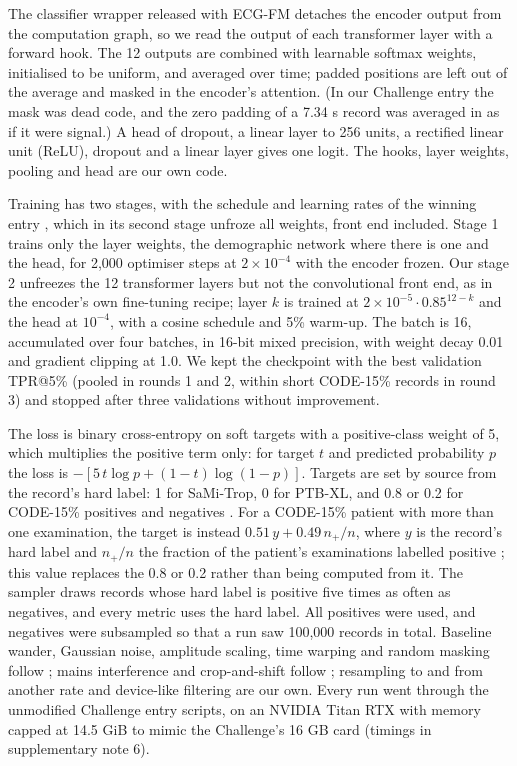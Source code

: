\documentclass{iopjournal}
\makeatletter
\newcommand{\tpr}{TPR@5\%}
\makeatother
\begin{document}
The classifier wrapper released with ECG-FM detaches the encoder output from the computation graph, so we read the output of each transformer layer with a forward hook. The 12 outputs are combined with learnable softmax weights, initialised to be uniform, and averaged over time; padded positions are left out of the average and masked in the encoder's attention. (In our Challenge entry the mask was dead code, and the zero padding of a 7.34 s record was averaged in as if it were signal.) A head of dropout, a linear layer to 256 units, a rectified linear unit (ReLU), dropout and a linear layer gives one logit. The hooks, layer weights, pooling and head are our own code.

Training has two stages, with the schedule and learning rates of the winning entry \citep{vansantvliet2025}, which in its second stage unfroze all weights, front end included. Stage 1 trains only the layer weights, the demographic network where there is one and the head, for 2,000 optimiser steps at $2\times10^{-4}$ with the encoder frozen. Our stage 2 unfreezes the 12 transformer layers but not the convolutional front end, as in the encoder's own fine-tuning recipe; layer $k$ is trained at $2\times10^{-5}\cdot0.85^{12-k}$ \citep{howard2018} and the head at $10^{-4}$, with a cosine schedule and 5\% warm-up. The batch is 16, accumulated over four batches, in 16-bit mixed precision, with weight decay 0.01 and gradient clipping at 1.0. We kept the checkpoint with the best validation \tpr{} (pooled in rounds 1 and 2, within short CODE-15\% records in round 3) and stopped after three validations without improvement.

The loss is binary cross-entropy on soft targets with a positive-class weight of 5, which multiplies the positive term only: for target $t$ and predicted probability $p$ the loss is $-[5\,t\log p+(1-t)\log(1-p)]$. Targets are set by source from the record's hard label: 1 for SaMi-Trop, 0 for PTB-XL, and 0.8 or 0.2 for CODE-15\% positives and negatives \citep{vansantvliet2025}. For a CODE-15\% patient with more than one examination, the target is instead $0.51\,y + 0.49\,n_{+}/n$, where $y$ is the record's hard label and $n_{+}/n$ the fraction of the patient's examinations labelled positive \citep{hong2025}; this value replaces the 0.8 or 0.2 rather than being computed from it. The sampler draws records whose hard label is positive five times as often as negatives, and every metric uses the hard label. All positives were used, and negatives were subsampled so that a run saw 100,000 records in total. Baseline wander, Gaussian noise, amplitude scaling, time warping and random masking follow \citet{hong2025}; mains interference and crop-and-shift follow \citet{vansantvliet2025}; resampling to and from another rate and device-like filtering are our own. Every run went through the unmodified Challenge entry scripts, on an NVIDIA Titan RTX with memory capped at 14.5 GiB to mimic the Challenge's 16 GB card (timings in supplementary note 6).
\end{document}

